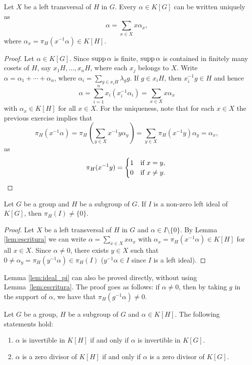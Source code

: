 \begin{lemma}
	\label{lem:escritura}
	Let $X$ be a left transversal of $H$ in $G$. Every $\alpha\in K[G]$ can be written
	uniquely as 
	\[
	\alpha=\sum_{x\in X}x\alpha_x,
	\]
	where $\alpha_x=\pi_H(x^{-1}\alpha)\in K[H]$.
\end{lemma}

\begin{proof}
	Let $\alpha\in K[G]$. Since $\operatorname{supp}\alpha$ is finite, $\operatorname{supp}\alpha$ is contained 
    in finitely many cosets of $H$, say $x_1H,\dots,x_nH$, where each 
	$x_j$ belongs to $X$. Write $\alpha=\alpha_1+\cdots+\alpha_n$,
	where $\alpha_i=\sum_{g\in x_iH}\lambda_gg$. If $g\in x_iH$, then 
	$x_i^{-1}g\in H$ and hence 
	\[
		\alpha=\sum_{i=1}^n x_i(x_i^{-1}\alpha_i)=\sum_{x\in X}x\alpha_x
	\]
	with $\alpha_x\in K[H]$ for all $x\in X$. For the uniqueness, note that 
	for each  $x\in X$ the previous exercise implies that  
	\[
		\pi_H(x^{-1}\alpha)
		=\pi_H\left(\sum_{y\in X}x^{-1}y\alpha_y\right)
		=\sum_{y\in X}\pi_H(x^{-1}y)\alpha_y=\alpha_x, 
	\]
	as  
	\[
		\pi_H(x^{-1}y)=\begin{cases}
		1 & \text{if $x=y$},\\
		0 & \text{if $x\ne y$}.
	\end{cases}\qedhere 
	\]
\end{proof}

\begin{lemma}
	\label{lem:ideal_pi}
	Let $G$ be a group and $H$ be a subgroup of $G$. If $I$ is a non-zero 
	left ideal
	of $K[G]$, then  $\pi_H(I)\ne\{0\}$.
\end{lemma}

\begin{proof}
	Let $X$ be a left transversal of $H$ in $G$ and $\alpha\in I\setminus\{0\}$. By Lemma
	\ref{lem:escritura} we can write $\alpha=\sum_{x\in
	X}x\alpha_x$ with $\alpha_x=\pi_H(x^{-1}\alpha)\in K[H]$ for all $x\in X$.
	Since $\alpha\ne0$, there exists $y\in X$ such that $0\ne
	\alpha_y=\pi_H(y^{-1}\alpha)\in\pi_H(I)$ ($y^{-1}\alpha\in I$ since $I$ is 
    a left ideal).
\end{proof}

Lemma \ref{lem:ideal_pi} 
can also be proved directly, without using Lemma~\ref{lem:escritura}. The proof goes as follows: if $\alpha\ne 0$, then by taking $g$ in the
support of $\alpha$, we have that $\pi_H (g^{-1}\alpha)\ne0$. 

\begin{exercise}
	Let $G$ be a group, $H$ be a subgroup of $G$ and $\alpha\in K[H]$. The following statements hold:
	\begin{enumerate}
		\item $\alpha$ is invertible in $K[H]$ if and only if $\alpha$ is
			invertible in $K[G]$.
		\item $\alpha$ is a zero divisor of $K[H]$ if and only if $\alpha$ is  
			a zero divisor of $K[G]$.
	\end{enumerate}
\end{exercise}

